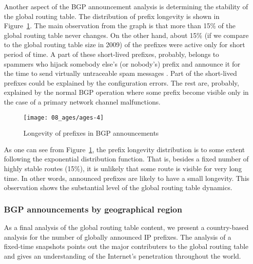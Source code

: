Another aspect of the BGP announcement analysis is determining the stability
of the global routing table. The distribution of prefix longevity is shown in
Figure~\ref{fig:bgp ages}. The main observation from the graph is that more
than 15\% of the global routing table never changes. On the other hand, about
15\% (if we compare to the global routing table size in 2009) of the prefixes
were active only for short period of time. A part of these short-lived
prefixes, probably, belongs to spammers who hijack somebody else's (or
nobody's) prefix and announce it for the time to send virtually untraceable
spam messages \cite{Ramachandran:2006:Understanding-the-network-level}. Part
of the short-lived prefixes could be explained by the configuration errors.
The rest are, probably, explained by the normal BGP operation where some
prefix become visible only in the case of a primary network channel
malfunctions.

\begin{figure}[htbp]
	\centering
		\texttt{[image: 08\_ages/ages-4]}
	\caption{Longevity of prefixes in BGP announcements}
	\label{fig:bgp ages}
\end{figure}

As one can see from Figure~\ref{fig:bgp ages}, the prefix longevity
distribution is to some extent following the exponential distribution
function. That is, besides a fixed number of highly stable routes (15\%), it
is unlikely that some route is visible for very long time. In other words,
announced prefixes are likely to have a small longevity. This observation
shows the substantial level of the global routing table dynamics.

\subsubsection{BGP announcements by geographical region}

As a final analysis of the global routing table content, we present a country-based analysis for the number of globally announced IP prefixes. The analysis of a fixed-time snapshots points out the major contributers to the global routing table and gives an understanding of the Internet's penetration throughout the world. 

